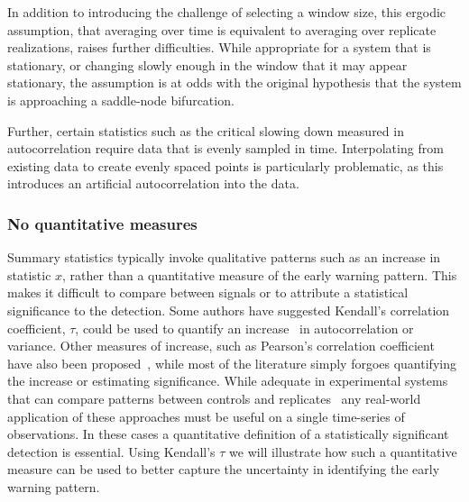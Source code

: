 \documentclass[authoryear,review,11pt]{elsarticle}
\begin{document}
In addition to introducing the challenge of selecting a window size, 
this ergodic assumption, 
that averaging over time is equivalent to averaging over replicate realizations,  
raises further difficulties.  
While appropriate for a system that is stationary, 
or changing slowly enough in the window that it may appear stationary,
the assumption is at odds with the original hypothesis 
that the system is approaching a saddle-node bifurcation. 

Further, certain statistics such as the critical slowing down measured in autocorrelation 
require data that is evenly sampled in time.  
Interpolating from existing data to create evenly spaced points is particularly problematic,
as this introduces an artificial autocorrelation into the data.  

\subsubsection*{No quantitative measures}
Summary statistics typically invoke qualitative patterns such as an increase in statistic $x$, 
rather than a quantitative measure of the early warning pattern.  
This makes it difficult to compare between signals or to
attribute a statistical significance to the detection.
Some authors have suggested Kendall's correlation coefficient, 
$\tau$, could be used to quantify an increase~\citep{Dakos2008, Dakos2011} 
in autocorrelation or variance.  
Other measures of increase, such as Pearson's correlation coefficient have also been proposed~\citep{Drake2010},
while most of the literature simply forgoes quantifying the increase or estimating significance.  
While adequate in experimental systems that can compare patterns between controls and replicates~\citep[\emph{e.g.}][]{Drake2010, Carpenter2011}
any real-world application of these approaches must be useful on a single time-series of observations.
In these cases a quantitative definition of a statistically significant detection is essential. 
Using Kendall's $\tau$ we will illustrate how such a quantitative measure 
can be used to better capture the uncertainty in identifying the early warning pattern.  
\end{document}
